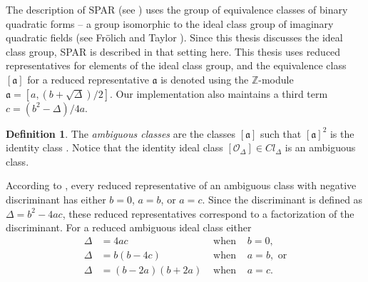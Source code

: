 \documentclass{ucalgthes1}
\theoremstyle{definition}
\newtheorem{defn}[thm]{Definition}
\newcommand{\ZZ}{\mathbb{Z}}
\begin{document}

The description of SPAR (see \cite{Schnorr1984}) uses the group of equivalence classes of binary quadratic forms -- a group isomorphic to the ideal class group of imaginary quadratic fields (see Fr{\"o}lich and Taylor \cite{Frolich1993}).  Since this thesis discusses the ideal class group, SPAR is described in that setting here.  This thesis uses reduced representatives for elements of the ideal class group, and the equivalence class $[\mathfrak a]$ for a reduced representative $\mathfrak a$ is denoted using the $\ZZ$\mbox{-}module $\mathfrak a = [a, (b + \sqrt\Delta)/2]$.  Our implementation also maintains a third term $c = (b^2 - \Delta)/4a$.


\begin{defn}
The \emph{ambiguous classes} are the classes $[\mathfrak a]$ such that ${[\mathfrak a]}^2$ is the identity class \cite[p.302]{Schnorr1984}.  Notice that the identity ideal class $[\mathcal O_\Delta] \in Cl_\Delta$ is an ambiguous class.
\end{defn}

According to \cite[p.303]{Schnorr1984}, every reduced representative of an ambiguous class with negative discriminant has either $b = 0$, $a = b$, or $a = c$.  Since the discriminant is defined as $\Delta = b^2 - 4ac$, these reduced representatives correspond to a factorization of the discriminant.  For a reduced ambiguous ideal class either
\begin{align*}
	\Delta &= 4ac & \textrm{ when } & b = 0, \\
	\Delta &= b(b-4c) & \textrm{ when } & a = b, \textrm{ or} \\
	\Delta &= (b - 2a)(b + 2a) & \textrm{ when } & a = c.
\end{align*}
\end{document}
